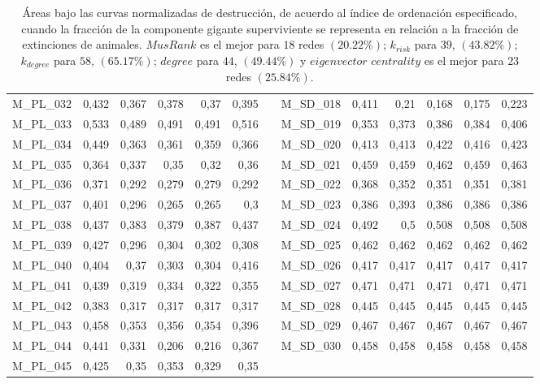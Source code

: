 \begin{table}[htbp]
\begin{adjustbox}{angle=90}
\begin{tabular}{lrrrrrrrrrrrr}
    M\_PL\_032 & 0,432 & 0,367 & 0,378 & 0,37 & 0,395 &      & M\_SD\_018 & 0,411 & 0,21 & 0,168 & 0,175 & 0,223 \\
    M\_PL\_033 & 0,533 & 0,489 & 0,491 & 0,491 & 0,516 &      & M\_SD\_019 & 0,353 & 0,373 & 0,386 & 0,384 & 0,406 \\
    M\_PL\_034 & 0,449 & 0,363 & 0,361 & 0,359 & 0,366 &      & M\_SD\_020 & 0,413 & 0,413 & 0,422 & 0,416 & 0,423 \\
    M\_PL\_035 & 0,364 & 0,337 & 0,35 & 0,32 & 0,36 &      & M\_SD\_021 & 0,459 & 0,459 & 0,462 & 0,459 & 0,463 \\
    M\_PL\_036 & 0,371 & 0,292 & 0,279 & 0,279 & 0,292 &      & M\_SD\_022 & 0,368 & 0,352 & 0,351 & 0,351 & 0,381 \\
    M\_PL\_037 & 0,401 & 0,296 & 0,265 & 0,265 & 0,3  &      & M\_SD\_023 & 0,386 & 0,393 & 0,386 & 0,386 & 0,386 \\
    M\_PL\_038 & 0,437 & 0,383 & 0,379 & 0,387 & 0,437 &      & M\_SD\_024 & 0,492 & 0,5  & 0,508 & 0,508 & 0,508 \\
    M\_PL\_039 & 0,427 & 0,296 & 0,304 & 0,302 & 0,308 &      & M\_SD\_025 & 0,462 & 0,462 & 0,462 & 0,462 & 0,462 \\
    M\_PL\_040 & 0,404 & 0,37 & 0,303 & 0,304 & 0,416 &      & M\_SD\_026 & 0,417 & 0,417 & 0,417 & 0,417 & 0,417 \\
    M\_PL\_041 & 0,439 & 0,319 & 0,334 & 0,322 & 0,355 &      & M\_SD\_027 & 0,471 & 0,471 & 0,471 & 0,471 & 0,471 \\
    M\_PL\_042 & 0,383 & 0,317 & 0,317 & 0,317 & 0,317 &      & M\_SD\_028 & 0,445 & 0,445 & 0,445 & 0,445 & 0,445 \\
    M\_PL\_043 & 0,458 & 0,353 & 0,356 & 0,354 & 0,396 &      & M\_SD\_029 & 0,467 & 0,467 & 0,467 & 0,467 & 0,467 \\
    M\_PL\_044 & 0,441 & 0,331 & 0,206 & 0,216 & 0,367 &      & M\_SD\_030 & 0,458 & 0,458 & 0,458 & 0,458 & 0,458 \\
    M\_PL\_045 & 0,425 & 0,35 & 0,353 & 0,329 & 0,35 &      &      &      &      &      &      &  \\
    \bottomrule
    \end{tabular}%
    \end{adjustbox}
    \caption{\label{table:juanma_destruction} Áreas bajo las curvas normalizadas de destrucción, de acuerdo al índice de ordenación especificado, cuando la fracción de la componente gigante superviviente se representa en relación a la fracción de extinciones de animales. $MusRank$ es el mejor para $18$ redes $(20.22\%)$;
$k_{risk}$ para $39$, $(43.82\%)$; $k_{degree}$ para $58$, $(65.17\%)$; $degree$ para $44$, $(49.44\%)$ y
$eigenvector$ $centrality$ es el mejor para $23$ redes $(25.84\%)$.}
\end{table}%




